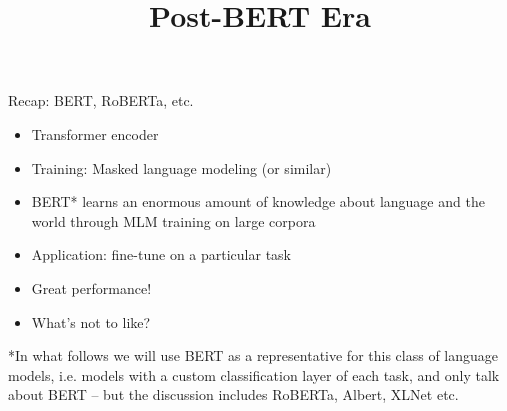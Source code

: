 


\usepackage{movie15}
\usepackage{animate}

\newcommand{\titlefigure}{figure/sesamestreet.jpeg}
\newcommand{\learninggoals}{
\item reformulating classification tasks
\item multi-task learning
\item fine-tuning on task-prefixes}

\title{Post-BERT Era}
\date{}




\begin{frame}{Recap: BERT, RoBERTa, etc.}

\vfill

  \begin{itemize}
\item Transformer encoder
\item Training: Masked language modeling (or similar)
\item BERT* learns an enormous amount of knowledge
about language and the world through MLM training on large corpora
\item Application: fine-tune on a particular task
\item Great performance!
\item \ques What's not to like?
    \end{itemize}

\vfill

*\scriptsize{In what follows we will use BERT as a representative for this class of language models, i.e. models with a custom classification layer of each task, and only talk about BERT -- but the discussion includes RoBERTa, Albert, XLNet etc.}

\end{frame}


